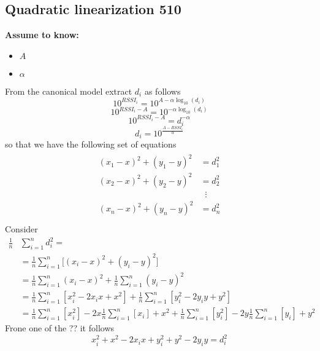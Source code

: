 \documentclass[12pt,twoside]{report}
\begin{document}
\subsection{Quadratic linearization 510}
  \begin{center}
  \textbf{Assume to know:}
  \begin{itemize}
    \centering
    \item $A$
    \item $\alpha$
  \end{itemize}
  \end{center}
From the canonical model extract $d_i$ as follows
\begin{equation*}
    10^{RSSI_{i}}=10^{A-\alpha\log_{10}(d_i)}
\end{equation*}
\begin{equation*}
    10^{RSSI_{i}-A}=10^{-\alpha\log_{10}(d_i)}
\end{equation*}
\begin{equation*}
     10^{RSSI_{i}-A}=d_i^{-\alpha}
\end{equation*}
\begin{equation}
    d_i=10^{\frac{A-RSSI_{i}}{\alpha}}
\end{equation}
so that we have the following set of equations
\begin{align}
\begin{split} 
(x_1-x)^2+(y_1-y)^2&=d_1^2 \\ 
(x_2-x)^2+(y_2-y)^2&=d_2^2 \\ 
&\;\;\vdots\\
(x_n-x)^2+(y_n-y)^2&=d_n^2 \\
\end{split}
\end{align}
Consider 
\begin{align}
\frac{1}{n}&\sum_{i=1}^nd_i^2=\\
&=\frac{1}{n}\sum_{i=1}^n\big[(x_i-x)^2+(y_i-y)^2\big]\\
&=\frac{1}{n}\sum_{i=1}^n(x_i-x)^2+\frac{1}{n}\sum_{i=1}^n(y_i-y)^2\\
&=\frac{1}{n}\sum_{i=1}^n[x_i^2-2x_ix+x^2] + \frac{1}{n}\sum_{i=1}^n[y_i^2-2y_iy+y^2]\\
&=\frac{1}{n}\sum_{i=1}^n[x_i^2]-2x\frac{1}{n}\sum_{i=1}^n[x_i]+ x^2 + \frac{1}{n}\sum_{i=1}^n[y_i^2]-2y\frac{1}{n}\sum_{i=1}^n[y_i]+ y^2
\end{align}
Frone one of the ?? it follows
\begin{equation}
x_i^2+x^2-2x_ix+y_i^2+y^2-2y_iy=d_i^2      
\end{equation}
\end{document}
